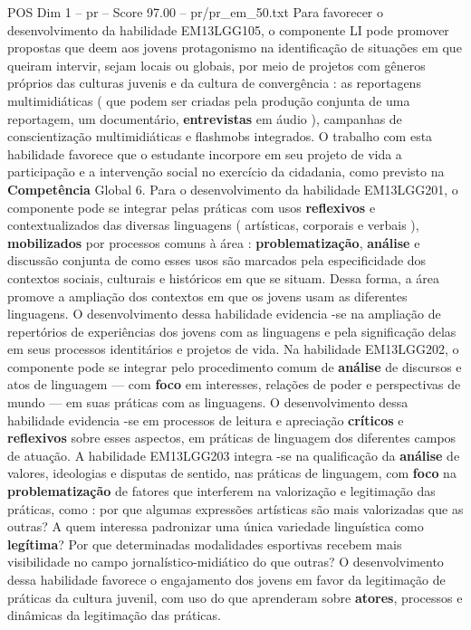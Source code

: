 \begin{textsample}{POS Dim 1 – pr – Score 97.00 – pr/pr\_em\_50.txt}
Para favorecer o desenvolvimento da habilidade EM13LGG105, o componente LI pode promover propostas que deem aos jovens protagonismo na identificação de situações em que queiram intervir, sejam locais ou globais, por meio de projetos com gêneros próprios das culturas juvenis e da cultura de convergência : as reportagens multimidiáticas ( que podem ser criadas pela produção conjunta de uma reportagem, um documentário, \textbf{entrevistas} em áudio ), campanhas de conscientização multimidiáticas e flashmobs integrados.
O trabalho com esta habilidade favorece que o estudante incorpore em seu projeto de vida a participação e a intervenção social no exercício da cidadania, como previsto na \textbf{Competência} Global 6.
Para o desenvolvimento da habilidade EM13LGG201, o componente pode se integrar pelas práticas com usos \textbf{reflexivos} e contextualizados das diversas linguagens ( artísticas, corporais e verbais ), \textbf{mobilizados} por processos comuns à área : \textbf{problematização}, \textbf{análise} e discussão conjunta de como esses usos são marcados pela especificidade dos contextos sociais, culturais e históricos em que se situam.
Dessa forma, a área promove a ampliação dos contextos em que os jovens usam as diferentes linguagens.
O desenvolvimento dessa habilidade evidencia -se na ampliação de repertórios de experiências dos jovens com as linguagens e pela significação delas em seus processos identitários e projetos de vida.
Na habilidade EM13LGG202, o componente pode se integrar pelo procedimento comum de \textbf{análise} de discursos e atos de linguagem — com \textbf{foco} em interesses, relações de poder e perspectivas de mundo — em suas práticas com as linguagens.
O desenvolvimento dessa habilidade evidencia -se em processos de leitura e apreciação \textbf{críticos} e \textbf{reflexivos} sobre esses aspectos, em práticas de linguagem dos diferentes campos de atuação.
A habilidade EM13LGG203 integra -se na qualificação da \textbf{análise} de valores, ideologias e disputas de sentido, nas práticas de linguagem, com \textbf{foco} na \textbf{problematização} de fatores que interferem na valorização e legitimação das práticas, como : por que algumas expressões artísticas são mais valorizadas que as outras?
A quem interessa padronizar uma única variedade linguística como \textbf{legítima}?
Por que determinadas modalidades esportivas recebem mais visibilidade no campo jornalístico-midiático do que outras?
O desenvolvimento dessa habilidade favorece o engajamento dos jovens em favor da legitimação de práticas da cultura juvenil, com uso do que aprenderam sobre \textbf{atores}, processos e dinâmicas da legitimação das práticas.

\end{textsample}
